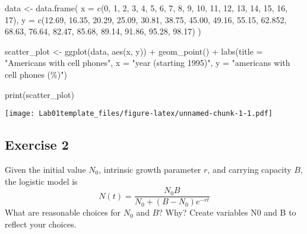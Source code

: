 \documentclass[
]{article}
\newenvironment{Shaded}{\begin{snugshade}}{\end{snugshade}}
\newcommand{\AttributeTok}[1]{\textcolor[rgb]{0.77,0.63,0.00}{#1}}
\newcommand{\DecValTok}[1]{\textcolor[rgb]{0.00,0.00,0.81}{#1}}
\newcommand{\FloatTok}[1]{\textcolor[rgb]{0.00,0.00,0.81}{#1}}
\newcommand{\FunctionTok}[1]{\textcolor[rgb]{0.00,0.00,0.00}{#1}}
\newcommand{\NormalTok}[1]{#1}
\newcommand{\OtherTok}[1]{\textcolor[rgb]{0.56,0.35,0.01}{#1}}
\newcommand{\SpecialCharTok}[1]{\textcolor[rgb]{0.00,0.00,0.00}{#1}}
\newcommand{\StringTok}[1]{\textcolor[rgb]{0.31,0.60,0.02}{#1}}
\begin{document}
\begin{Shaded}
\begin{Highlighting}[]
\NormalTok{data }\OtherTok{\textless{}{-}} \FunctionTok{data.frame}\NormalTok{(}
  \AttributeTok{x =} \FunctionTok{c}\NormalTok{(}\DecValTok{0}\NormalTok{, }\DecValTok{1}\NormalTok{, }\DecValTok{2}\NormalTok{, }\DecValTok{3}\NormalTok{, }\DecValTok{4}\NormalTok{, }\DecValTok{5}\NormalTok{, }\DecValTok{6}\NormalTok{, }\DecValTok{7}\NormalTok{, }\DecValTok{8}\NormalTok{, }\DecValTok{9}\NormalTok{, }\DecValTok{10}\NormalTok{, }\DecValTok{11}\NormalTok{, }\DecValTok{12}\NormalTok{, }\DecValTok{13}\NormalTok{, }\DecValTok{14}\NormalTok{, }\DecValTok{15}\NormalTok{, }\DecValTok{16}\NormalTok{, }\DecValTok{17}\NormalTok{),}
  \AttributeTok{y =} \FunctionTok{c}\NormalTok{(}\FloatTok{12.69}\NormalTok{, }\FloatTok{16.35}\NormalTok{, }\FloatTok{20.29}\NormalTok{, }\FloatTok{25.09}\NormalTok{, }\FloatTok{30.81}\NormalTok{, }\FloatTok{38.75}\NormalTok{, }\FloatTok{45.00}\NormalTok{, }\FloatTok{49.16}\NormalTok{, }\FloatTok{55.15}\NormalTok{, }\FloatTok{62.852}\NormalTok{, }\FloatTok{68.63}\NormalTok{, }\FloatTok{76.64}\NormalTok{, }\FloatTok{82.47}\NormalTok{, }\FloatTok{85.68}\NormalTok{, }\FloatTok{89.14}\NormalTok{, }\FloatTok{91.86}\NormalTok{, }\FloatTok{95.28}\NormalTok{, }\FloatTok{98.17}\NormalTok{)}
\NormalTok{)}

\NormalTok{scatter\_plot }\OtherTok{\textless{}{-}} \FunctionTok{ggplot}\NormalTok{(data, }\FunctionTok{aes}\NormalTok{(x, y)) }\SpecialCharTok{+}
  \FunctionTok{geom\_point}\NormalTok{() }\SpecialCharTok{+}
  \FunctionTok{labs}\NormalTok{(}\AttributeTok{title =} \StringTok{"Americans with cell phones"}\NormalTok{,}
       \AttributeTok{x =} \StringTok{"year (starting 1995)"}\NormalTok{,}
       \AttributeTok{y =} \StringTok{"americans with cell phones (\%)"}\NormalTok{)}

\FunctionTok{print}\NormalTok{(scatter\_plot)}
\end{Highlighting}
\end{Shaded}

\texttt{[image: Lab01template\_files/figure-latex/unnamed-chunk-1-1.pdf]}

\hypertarget{exercise-2}{%
\subsection{Exercise 2}\label{exercise-2}}

Given the initial value \(N_0\), intrinsic growth parameter \(r\), and
carrying capacity \(B\), the logistic model is
\[N(t) = \dfrac{N_0 B}{N_0 + (B-N_0)e^{-rt}}\] What are reasonable
choices for \(N_0\) and \(B\)? Why? Create variables N0 and B to reflect
your choices.
\end{document}
